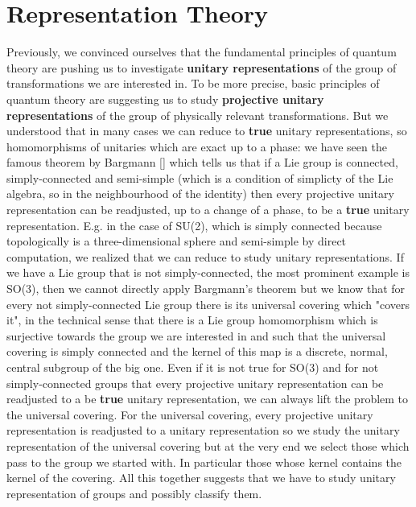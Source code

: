 \documentclass[../main.tex]{subfiles}
\begin{document}
\setchapterpreamble[u]{\margintoc}
\chapter[Representation Theory]{Representation Theory\footnotemark[0]}
Previously, we convinced ourselves that the fundamental principles of quantum theory are pushing us to investigate \textbf{unitary representations} of the group of transformations we are interested in. To be more precise, basic principles of quantum theory are suggesting us to study \textbf{projective unitary representations} of the group of physically relevant transformations. But we understood that in many cases we can reduce to \textbf{true} unitary representations, so homomorphisms of unitaries which are exact up to a phase: we have seen the famous theorem by Bargmann [] which tells us that if a Lie group is connected, simply-connected and semi-simple (which is a condition of simplicty of the Lie algebra, so in the neighbourhood of the identity) then every projective unitary representation can be readjusted, up to a change of a phase, to be a \textbf{true} unitary representation. E.g. in the case of SU(2), which is simply connected because topologically is a three-dimensional sphere and semi-simple by direct computation, we realized that we can reduce to study unitary representations. If we have a Lie group that is not simply-connected, the most prominent example is SO(3), then we cannot directly apply Bargmann's theorem but we know that for every not simply-connected Lie group there is its universal covering which "covers it", in the technical sense that there is a Lie group homomorphism which is surjective towards the group we are interested in and such that the universal covering is simply connected and the kernel of this map is a discrete, normal, central subgroup of the big one. Even if it is not true for SO(3) and for not simply-connected groups that every projective unitary representation can be readjusted to a be \textbf{true} unitary representation, we can always lift the problem to the universal covering. For the universal covering, every projective unitary representation is readjusted to a unitary representation so we study the unitary representation of the universal covering but at the very end we select those which pass to the group we started with. In particular those whose kernel contains the kernel of the covering. All this together suggests that we have to study unitary representation of groups and possibly classify them.
\end{document}
